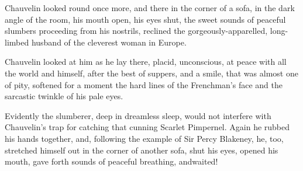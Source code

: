 Chauvelin looked round once more, and there in the corner of a sofa, in the dark angle of the room, his mouth open, his eyes shut, the sweet sounds of peaceful slumbers proceeding from his nostrils, reclined the gorgeously-apparelled, long-limbed husband of the cleverest woman in Europe.

Chauvelin looked at him as he lay there, placid, unconscious, at peace with all the world and himself, after the best of suppers, and a smile, that was almost one of pity, softened for a moment the hard lines of the Frenchman's face and the sarcastic twinkle of his pale eyes.

Evidently the slumberer, deep in dreamless sleep, would not interfere with Chauvelin's trap for catching that cunning Scarlet Pimpernel. Again he rubbed his hands together, and, following the example of Sir Percy Blakeney, he, too, stretched himself out in the corner of another sofa, shut his eyes, opened his mouth, gave forth sounds of peaceful breathing, and\textellipsis waited!